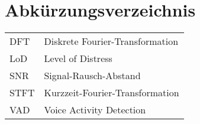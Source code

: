 \chapter*{Abkürzungsverzeichnis}




\begin{table}[h]
\begin{tabular}{ll}
DFT  & Diskrete Fourier-Transformation \\
LoD  & Level of Distress               \\
SNR  & Signal-Rausch-Abstand           \\
STFT & Kurzzeit-Fourier-Transformation \\
VAD  & Voice Activity Detection       
\end{tabular}
\end{table}